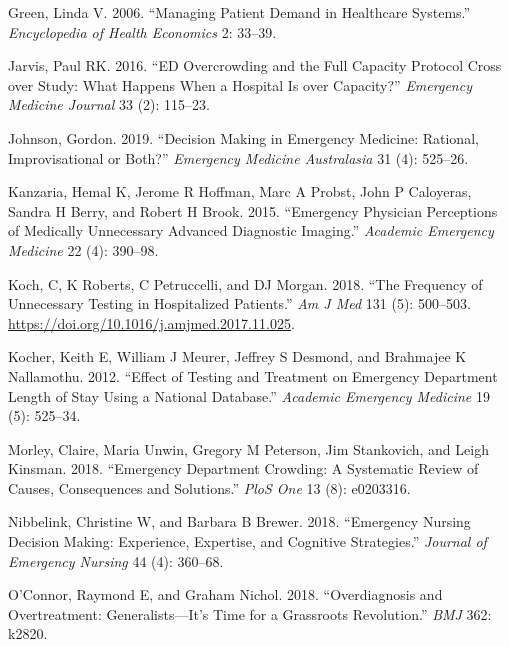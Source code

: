 \documentclass{article}
\newlength{\cslhangindent}
\newlength{\cslentryspacingunit} %
\newenvironment{CSLReferences}[2] %
 {%
  \setlength{\parindent}{0pt}
  \ifodd #1
  \let\oldpar\par
  \def\par{\hangindent=\cslhangindent\oldpar}
  \fi
  \setlength{\parskip}{#2\cslentryspacingunit}
 }%
 {}
\begin{document}
\begin{CSLReferences}{1}{0}
\leavevmode{}%
Green, Linda V. 2006. {``Managing Patient Demand in Healthcare
Systems.''} \emph{Encyclopedia of Health Economics} 2: 33--39.

\leavevmode{}%
Jarvis, Paul RK. 2016. {``ED Overcrowding and the Full Capacity Protocol
Cross over Study: What Happens When a Hospital Is over Capacity?''}
\emph{Emergency Medicine Journal} 33 (2): 115--23.

\leavevmode{}%
Johnson, Gordon. 2019. {``Decision Making in Emergency Medicine:
Rational, Improvisational or Both?''} \emph{Emergency Medicine
Australasia} 31 (4): 525--26.

\leavevmode{}%
Kanzaria, Hemal K, Jerome R Hoffman, Marc A Probst, John P Caloyeras,
Sandra H Berry, and Robert H Brook. 2015. {``Emergency Physician
Perceptions of Medically Unnecessary Advanced Diagnostic Imaging.''}
\emph{Academic Emergency Medicine} 22 (4): 390--98.

\leavevmode{}%
Koch, C, K Roberts, C Petruccelli, and DJ Morgan. 2018. {``The Frequency
of Unnecessary Testing in Hospitalized Patients.''} \emph{Am J Med} 131
(5): 500--503. \url{https://doi.org/10.1016/j.amjmed.2017.11.025}.

\leavevmode{}%
Kocher, Keith E, William J Meurer, Jeffrey S Desmond, and Brahmajee K
Nallamothu. 2012. {``Effect of Testing and Treatment on Emergency
Department Length of Stay Using a National Database.''} \emph{Academic
Emergency Medicine} 19 (5): 525--34.

\leavevmode{}%
Morley, Claire, Maria Unwin, Gregory M Peterson, Jim Stankovich, and
Leigh Kinsman. 2018. {``Emergency Department Crowding: A Systematic
Review of Causes, Consequences and Solutions.''} \emph{PloS One} 13 (8):
e0203316.

\leavevmode{}%
Nibbelink, Christine W, and Barbara B Brewer. 2018. {``Emergency Nursing
Decision Making: Experience, Expertise, and Cognitive Strategies.''}
\emph{Journal of Emergency Nursing} 44 (4): 360--68.

\leavevmode{}%
O'Connor, Raymond E, and Graham Nichol. 2018. {``Overdiagnosis and
Overtreatment: Generalists---It's Time for a Grassroots Revolution.''}
\emph{BMJ} 362: k2820.


\end{CSLReferences}
\end{document}
